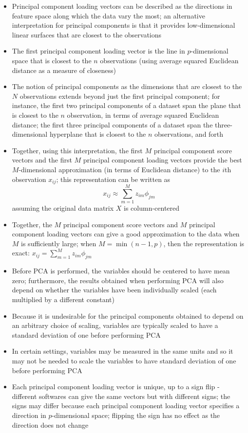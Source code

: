 \documentclass[12pt]{article}
\begin{document}
\begin{itemize}
\item Principal component loading vectors can be described as the directions in feature space along which the data vary the most; an alternative interpretation for principal components is that it provides low-dimensional linear surfaces that are closest to the observations 
\item The first principal component loading vector is the line in $p$-dimensional space that is closest to the $n$ observations (using average squared Euclidean distance as a measure of closeness)
\item The notion of principal components as the dimensions that are closest to the $N$ observations extends beyond just the first principal component; for instance, the first two principal components of a dataset span the plane that is closest to the $n$ observation, in terms of average squared Euclidean distance; the first three principal components of a dataset span the three-dimensional hyperplane that is closest to the $n$ observations, and forth
\item Together, using this interpretation, the first $M$ principal component score vectors and the first $M$ principal component loading vectors provide the best $M$-dimensional approximation (in terms of Euclidean distance) to the $i$th observation $x_{ij}$; this representation can be written as $$ x_{ij} \approx \sum_{m=1}^M z_{im}\phi_{jm} $$ assuming the original data matrix $X$ is column-centered 
\item Together, the $M$ principal component score vectors and $M$ principal component loading vectors can give a good approximation to the data when $M$ is sufficiently large; when $M = \min(n-1, p)$, then the representation is exact: $x_{ij} = \sum_{m=1}^M z_{im}\phi_{jm}$ 
\item Before PCA is performed, the variables should be centered to have mean zero; furthermore, the results obtained when performing PCA will also depend on whether the variables have been individually scaled (each multiplied by a different constant)
\item Because it is undesirable for the principal components obtained to depend on an arbitrary choice of scaling, variables are typically scaled to have a standard deviation of one before performing PCA
\item In certain settings, variables may be measured in the same units and so it may not be needed to scale the variables to have standard deviation of one before performing PCA 
\item Each principal component loading vector is unique, up to a sign flip - different softwares can give the same vectors but with different signs; the signs may differ because each principal component loading vector specifies a direction in $p$-dimensional space; flipping the sign has no effect as the direction does not change 

\end{itemize}
\end{document}
